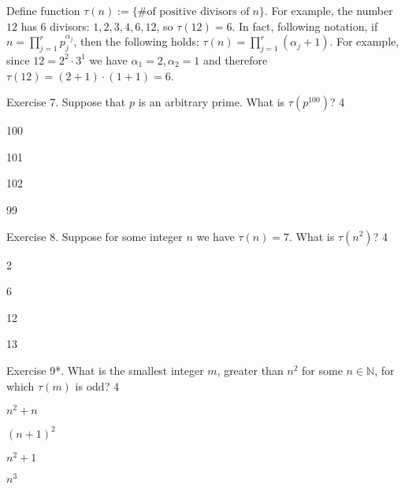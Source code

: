 \documentclass[../lecture-notes-148x210.tex]{subfiles}
\begin{document}
\begin{tcolorbox}
[ colback=blue!5!white, fonttitle=\bfseries, colframe=blue!80!white,
    title=Exercises 7-9. Tau Function] Define function $\tau(n) := \{\text{\#
    of positive divisors of}\; n\}$. For example, the number $12$ has 6 divisors:
    $1,2,3,4,6,12$, so $\tau(12)=6$. In fact, following
     notation, if $n=\prod_{j=1}^r
    p_j^{\alpha_j}$, then the following holds: $\tau(n) =
    \prod_{j=1}^r(\alpha_j + 1)$. For example, since $12=2^2 \cdot 3^1$ we have
    $\alpha_1=2,\alpha_2=1$ and therefore $\tau(12)=(2+1)\cdot (1+1)=6$. 
\end{tcolorbox}

\begin{xexercise}
    {Exercise 7.}
    {Suppose that $p$ is an arbitrary prime. What is $\tau(p^{100})$? }
    {4}
    {
        \item 100
        \item 101
        \item 102
        \item 99
    }    
\end{xexercise}

\begin{xexercise}
    {Exercise 8.}
    {Suppose for some integer $n$ we have $\tau(n)=7$. What is $\tau(n^2)$? \vspace*{-4mm}}
    {4}
    {
        \item 2
        \item 6
        \item 12
        \item 13
    }    
\end{xexercise}

\begin{xexercise}
    {Exercise 9*.}
    {What is the smallest integer $m$, greater than $n^2$ for some $n \in \mathbb{N}$, for which $\tau(m)$ is odd?}
    {4}
    {
        \item $n^2+n$
        \item $(n+1)^2$
        \item $n^2+1$
        \item $n^3$
    }    
\end{xexercise}
\end{document}
